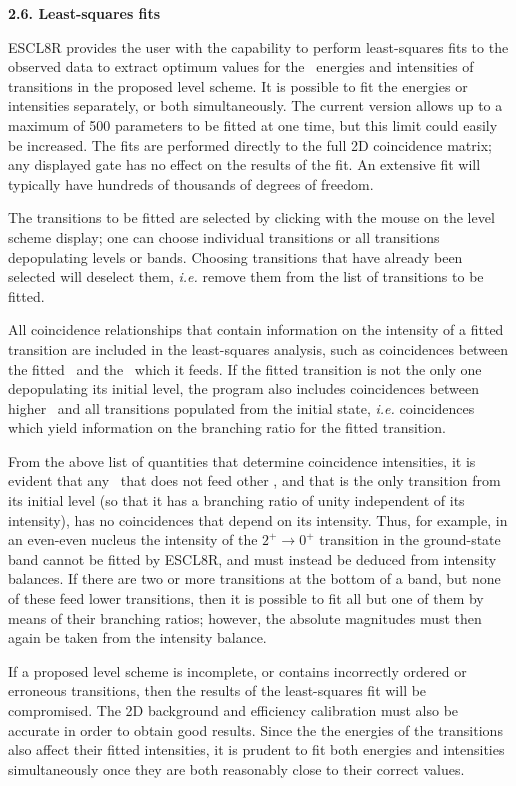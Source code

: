 \noindent
{\bf 2.6. Least-squares fits}

ESCL8R provides the user with the capability to perform least-squares fits to
the observed data to extract optimum values for the \ghray\ energies and
intensities of transitions in the proposed level scheme. It is possible to fit
the energies or intensities separately, or both simultaneously. The current
version allows up to a maximum of 500 parameters to be fitted at one time, but
this limit could easily be increased. The fits are performed directly to the
full 2D coincidence matrix; any displayed gate has no effect on the results of
the fit. An extensive fit will typically have hundreds of thousands of degrees
of freedom.

The transitions to be fitted are selected by clicking with the mouse on the
level scheme display; one can choose individual transitions or all transitions
depopulating levels or bands. Choosing transitions that have already been
selected will deselect them, {\em i.e.} remove them from the list of
transitions to be fitted.

All coincidence relationships that contain information on the intensity of a
fitted transition are included in the least-squares analysis, such as
coincidences between the fitted \gray\ and the \grays\ which it feeds. If the
fitted transition is not the only one depopulating its initial level, the
program also includes coincidences between higher \grays\ and all transitions
populated from the initial state, {\em i.e.} coincidences which yield
information on the branching ratio for the fitted transition.

From the above list of quantities that determine coincidence intensities, it is
evident that any \gray\ that does not feed other \grays, and that is the
only transition from its initial level (so that it has a branching ratio of
unity independent of its intensity), has no coincidences that depend
on its intensity. Thus, for example, in an even-even nucleus the intensity of
the $2^+ \rightarrow 0^+$ transition in the ground-state band cannot be fitted
by ESCL8R, and must instead be deduced from intensity balances. If there are
two or more transitions at the bottom of a band, but none of these feed lower
transitions, then it is possible to fit all but one of them by means of their
branching ratios; however, the absolute magnitudes must then again be taken
from the intensity balance.

If a proposed level scheme is incomplete, or contains incorrectly ordered or
erroneous transitions, then the results of the least-squares fit will be
compromised. The 2D background and efficiency calibration must also be accurate
in order to obtain good results. Since the the energies of the transitions also
affect their fitted intensities, it is prudent to fit both energies and
intensities simultaneously once they are both reasonably close to their correct
values.

